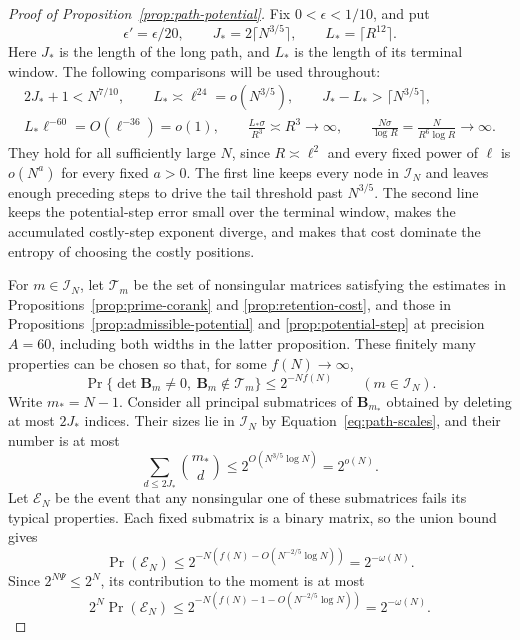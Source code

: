 \begin{proof}[Proof of Proposition~\ref{prop:path-potential}]
Fix \(0<\epsilon<1/10\), and put
\[
 \epsilon'=\epsilon/20,\qquad
 J_*=2\lceil N^{3/5}\rceil,\qquad
 L_*=\lceil R^{12}\rceil.
\]
Here \(J_*\) is the length of the long path, and \(L_*\) is the length
of its terminal window. The following comparisons will be used throughout:
\begin{equation}\label{eq:path-scales}
 \begin{gathered}
 2J_*+1<N^{7/10},\qquad
 L_*\asymp\ell^{24}=o(N^{3/5}),\qquad
 J_*-L_*>\lceil N^{3/5}\rceil,\\
 L_*\ell^{-60}=O(\ell^{-36})=o(1),\qquad
 \frac{L_*\sigma}{R^3}\asymp R^3\longrightarrow\infty,\qquad
 \frac{N\sigma}{\log R}=\frac{N}{R^6\log R}\longrightarrow\infty.
 \end{gathered}
\end{equation}
They hold for all sufficiently large \(N\), since \(R\asymp\ell^2\)
and every fixed power of \(\ell\) is \(o(N^a)\) for every fixed \(a>0\).
The first line keeps every node in \(\mathcal I_N\) and leaves enough
preceding steps to drive the tail threshold past \(N^{3/5}\). The second
line keeps the potential-step error small over the terminal window, makes
the accumulated costly-step exponent diverge, and makes that cost dominate
the entropy of choosing the costly positions.

For \(m\in\mathcal I_N\), let \(\mathcal T_m\) be the set of
nonsingular matrices satisfying the estimates in
Propositions~\ref{prop:prime-corank} and \ref{prop:retention-cost},
and those in Propositions~\ref{prop:admissible-potential} and
\ref{prop:potential-step} at precision \(A=60\), including both
widths in the latter proposition. These finitely many properties can
be chosen so that, for some \(f(N)\to\infty\),
\[
 \Pr\{\det\mathbf B_m\ne0,\ \mathbf B_m\notin\mathcal T_m\}
 \le2^{-Nf(N)}
 \qquad(m\in\mathcal I_N).
\]
Write \(m_*=N-1\). Consider all principal submatrices of
\(\mathbf B_{m_*}\) obtained by deleting at most \(2J_*\) indices.
Their sizes lie in \(\mathcal I_N\) by
Equation~\eqref{eq:path-scales}, and their number is at most
\[
 \sum_{d\le2J_*}\binom{m_*}{d}
 \le2^{O(N^{3/5}\log N)}=2^{o(N)}.
\]
Let \(\mathcal E_N\) be the event that any nonsingular one of these
submatrices fails its typical properties. Each fixed submatrix is a
binary matrix, so the union bound gives
\begin{equation}\label{eq:path-typical-exception}
 \Pr(\mathcal E_N)
 \le 2^{-N(f(N)-O(N^{-2/5}\log N))}=2^{-\omega(N)}.
\end{equation}
Since \(2^{N\Psi}\le2^N\), its contribution to the moment is at most
\[
 2^N\Pr(\mathcal E_N)
 \le2^{-N(f(N)-1-O(N^{-2/5}\log N))}=2^{-\omega(N)}.
\]


\end{proof}
